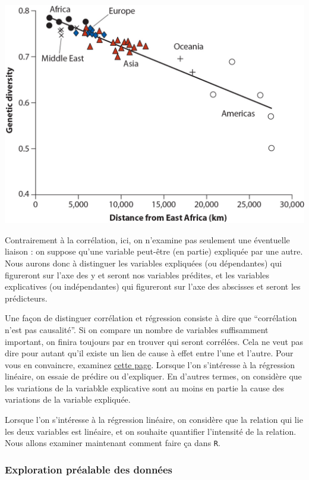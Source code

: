 \documentclass[a4paperpaper,]{article}
\begin{document}
\includegraphics{images/genetics.jpg}

Contrairement à la corrélation, ici, on n'examine pas seulement une éventuelle liaison : on suppose qu'une variable peut-être (en partie) expliquée par une autre. Nous aurons donc à distinguer les variables expliquées (ou dépendantes) qui figureront sur l'axe des y et seront nos variables prédites, et les variables explicatives (ou indépendantes) qui figureront sur l'axe des abscisses et seront les prédicteurs.

Une façon de distinguer corrélation et régression consiste à dire que ``corrélation n'est pas causalité''. Si on compare un nombre de variables suffisamment important, on finira toujours par en trouver qui seront corrélées. Cela ne veut pas dire pour autant qu'il existe un lien de cause à effet entre l'une et l'autre. Pour vous en convaincre, examinez \href{http://www.tylervigen.com/spurious-correlations}{cette page}. Lorsque l'on s'intéresse à la régression linéaire, on essaie de prédire ou d'expliquer. En d'autres termes, on considère que les variations de la variabkle explicative sont au moins en partie la cause des variations de la variable expliquée.

Lorsque l'on s'intéresse à la régression linéaire, on considère que la relation qui lie les deux variables est linéaire, et on souhaite quantifier l'intensité de la relation. Nous allons examiner maintenant comment faire ça dans \texttt{R}.

\hypertarget{exploration-prealable-des-donnees-3}{%
\subsubsection{Exploration préalable des données}\label{exploration-prealable-des-donnees-3}}
\end{document}
